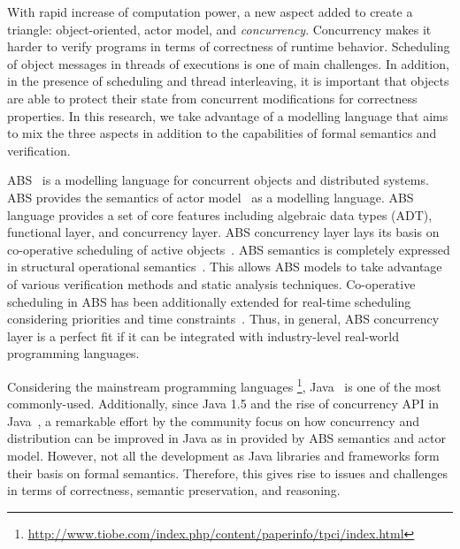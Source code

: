 With rapid increase of computation power, a new aspect added to create a triangle: object-oriented, actor model, and \emph{concurrency}.
Concurrency makes it harder to verify programs in terms of correctness of runtime behavior. 
Scheduling of object messages in threads of executions is one of main challenges.
In addition, in the presence of scheduling and thread interleaving, it is important that objects are able to protect their state from concurrent modifications for correctness properties.
In this research, we take advantage of a modelling language that aims to mix the three aspects in addition to the capabilities of formal semantics and verification.

ABS~\cite{johnsen2012abs,hahnlehjlssw11} is a modelling language for concurrent objects and distributed systems.
ABS provides the semantics of actor model~\cite{actors:agha} as a modelling language.
ABS language provides a set of core features including algebraic data types (ADT), functional layer, and concurrency layer.
ABS concurrency layer lays its basis on co-operative scheduling of active objects~\cite{creol:broch:owe}.
ABS semantics is completely expressed in structural operational semantics~\cite{plotkin:sos}.
This allows ABS models to take advantage of various verification methods and static analysis techniques.
% 
Co-operative scheduling in ABS has been additionally extended for real-time scheduling considering priorities and time constraints~\cite{bjork2013:rtabs,johnsen2012modeling}.
Thus, in general, ABS concurrency layer is a perfect fit if it can be integrated with industry-level real-world programming languages.

Considering the mainstream programming languages
\footnote{\url{http://www.tiobe.com/index.php/content/paperinfo/tpci/index.html}}, Java~\cite{gosling2000java} is one of the most commonly-used.
Additionally, since Java 1.5 and the rise of concurrency API in Java~\cite{jsr166}, a remarkable effort by the community focus on how concurrency and distribution can be improved in Java as in provided by ABS semantics and actor model.
However, not all the development as Java libraries and frameworks form their basis on formal semantics. 
Therefore, this gives rise to issues and challenges in terms of correctness, semantic preservation, and reasoning.

